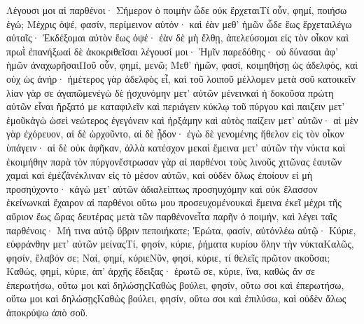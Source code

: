 Λέγουσι μοι αἱ παρθένοι· Σήμερον ὁ ποιμὴν ὧδε οὐκ ἔρχεταιΤί οὖν, φημί, ποιήσω ἐγώ; Μέχρις ὀψέ, φασίν, περίμεινον αὐτόν· καὶ ἐὰν μεθ’ ἡμῶν ὧδε ἕως ἔρχεταιλέγω αὐταῖς· Ἐκδέξομαι αὐτὸν ἕως ὀψέ· ἐὰν δὲ μὴ ἔλθῃ, ἀπελεύσομαι εἰς τὸν οἶκον καὶ πρωῒ ἐπανήξωαἱ δὲ ἀκοκριθεῖσαι λέγουσί μοι· Ἡμῖν παρεδόθης· οὐ δύνασαι ἀφ’ ἡμῶν ἀναχωρῆσαιΠοῦ οὖν, φημί, μενῶ; Μεθ’ ἡμῶν, φασί, κοιμηθήσῃ ὡς ἀδελφός, καὶ οὐχ ὡς ἀνήρ· ἡμέτερος γὰρ ἀδελφὸς εἶ, καὶ τοῦ λοιποῦ μέλλομεν μετὰ σοῦ κατοικεῖν λίαν γὰρ σε ἀγαπῶμενἐγὼ δὲ ᾐσχυνόμην μετ’ αὐτῶν μένεινκαὶ ἡ δοκοῦσα πρώτη αὐτῶν εἶναι ἤρξατό με καταφιλεῖν καὶ περιάγειν κύκλῳ τοῦ πύργου καὶ παιζειν μετ’ ἐμοῦκἀγὼ ὡσεὶ νεώτερος ἐγεγόνειν καὶ ἠρξάμην καὶ αὐτὸς παίζειν μετ’ αὐτῶν· αἱ μὲν γὰρ ἐχόρευον, αἱ δὲ ὠρχοῦντο, αἱ δὲ ᾖδον· ἐγὼ δὲ γενομένης ἤθελον εἰς τὸν οἶκον ὑπάγειν· αἱ δὲ οὐκ ἀφῆκαν, ἀλλὰ κατέσχον μεκαὶ ἔμεινα μετ’ αὐτῶν τὴν νύκτα καὶ ἐκοιμήθην παρὰ τὸν πύργονἔστρωσαν γὰρ αἱ παρθένοι τοὺς λινοῦς χιτῶνας ἑαυτῶν χαμαὶ καὶ ἐμὲζ̓ἀνέκλιναν εἰς τὸ μέσον αὐτῶν, καὶ οὐδὲν ὅλως ἐποίουν εἰ μὴ προσηύχοντο· κἀγὼ μετ’ αὐτῶν ἀδιαλείπτως προσηυχόμην καὶ οὐκ ἔλασσον ἐκείνωνκαὶ ἔχαιρον αἱ παρθένοι οὕτω μου προσευχομένουκαὶ ἔμεινα ἐκεῖ μέχρι τῆς αὔριον ἕως ὥρας δευτέρας μετὰ τῶν παρθένονεἶτα παρῆν ὁ ποιμήν, καὶ λέγει ταῖς παρθένοις· Μή τινα αὐτῷ ὕβριν πεποιήκατε; Ἐρώτα, φασίν, αὐτόνλέω αὐτῷ· Κύριε, εὐφράνθην μετ’ αὐτῶν μείναςΤί, φησίν, κύριε, ῥήματα κυρίου ὅλην τὴν νύκταΚαλῶς, φησίν, ἔλαβόν σε; Ναί, φημί, κύριεΝῦν, φησί, κύριε, τί θελεῖς πρῶτον ακοῦσαι; Καθώς, φημί, κύριε, ἀπ’ ἀρχῆς ἔδειξας· ἐρωτῶ σε, κύριε, ἵνα, καθὼς ἄν σε ἐπερωτήσω, οὕτω μοι καὶ δηλώσῃςΚαθὼς βούλει, φησίν, οὕτω σοι καὶ ἐπερωτήσω, οὕτω μοι καὶ δηλώσῃςΚαθὼς βούλει, φησίν, οὕτω σοι καὶ ἐπιλύσω, καὶ οὐδὲν ἄλως ἀποκρύψω ἀπὸ σοῦ.
